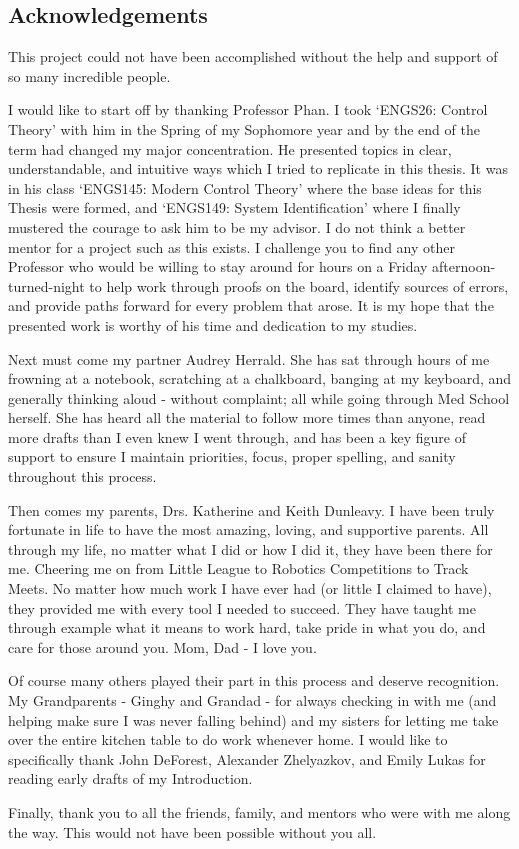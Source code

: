 \pagestyle{plain}
\begin{center}


\section*{Acknowledgements}


\end{center}
This project could not have been accomplished without the help and support of so many incredible people.

I would like to start off by thanking Professor Phan. I took `ENGS26: Control Theory' with him in the Spring of my Sophomore year and by the end of the term had changed my major concentration. He presented topics in clear, understandable, and intuitive ways which I tried to replicate in this thesis. It was in his class `ENGS145: Modern Control Theory' where the base ideas for this Thesis were formed, and `ENGS149: System Identification' where I finally mustered the courage to ask him to be my advisor. I do not think a better mentor for a project such as this exists. I challenge you to find any other Professor who would be willing to stay around for hours on a Friday afternoon-turned-night to help work through proofs on the board, identify sources of errors, and provide paths forward for every problem that arose. It is my hope that the presented work is worthy of his time and dedication to my studies.

Next must come my partner Audrey Herrald. She has sat through hours of me frowning at a notebook, scratching at a chalkboard, banging at my keyboard, and generally thinking aloud - without complaint; all while going through Med School herself. She has heard all the material to follow more times than anyone, read more drafts than I even knew I went through, and has been a key figure of support to ensure I maintain priorities, focus, proper spelling, and sanity throughout this process. 

Then comes my parents, Drs. Katherine and Keith Dunleavy. I have been truly fortunate in life to have the most amazing, loving, and supportive parents. All through my life, no matter what I did or how I did it, they have been there for me. Cheering me on from Little League to Robotics Competitions to Track Meets. No matter how much work I have ever had (or little I claimed to have), they provided me with every tool I needed to succeed. They have taught me through example what it means to work hard, take pride in what you do, and care for those around you. Mom, Dad - I love you.

Of course many others played their part in this process and deserve recognition. My Grandparents - Ginghy and Grandad - for always checking in with me (and helping make sure I was never falling behind) and my sisters for letting me take over the entire kitchen table to do work whenever home. I would like to specifically thank John DeForest, Alexander Zhelyazkov, and Emily Lukas for reading early drafts of my Introduction. 

Finally, thank you to all the friends, family, and mentors who were with me along the way. This would not have been possible without you all.
\cleardoublepage%
